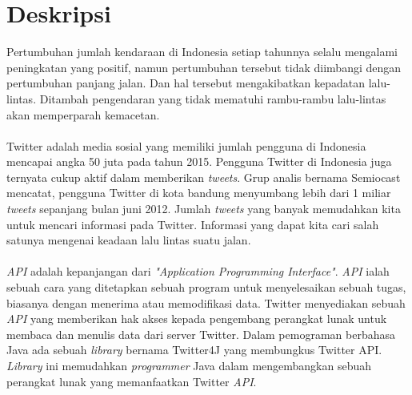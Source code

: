 \documentclass[a4paper,twoside]{article}
\begin{document}
\title{\@judultopik}
\author{\nama \textendash \@npm}

\newcommand{\nama}{Steven Daniel}
\newcommand{\@npm}{2012730021}
\newcommand{\@judultopik}{Penentuan Tingkat Kemacetan Berdasarkan Twitter Menggunakan Jaringan Syaraf Tiruan} %
\newcommand{\jumpemb}{1} %
\newcommand{\tanggal}{8/27/2015}
\maketitle


\section{Deskripsi}
Pertumbuhan jumlah kendaraan di Indonesia setiap tahunnya selalu mengalami peningkatan yang positif, namun pertumbuhan tersebut tidak diimbangi dengan pertumbuhan panjang jalan. Dan hal tersebut mengakibatkan kepadatan lalu-lintas. Ditambah pengendaran yang tidak mematuhi rambu-rambu lalu-lintas akan memperparah kemacetan.\\\\
Twitter adalah media sosial yang memiliki jumlah pengguna di Indonesia mencapai angka 50 juta pada tahun 2015. Pengguna Twitter di Indonesia juga ternyata cukup aktif dalam memberikan \textit{tweets}. Grup analis bernama Semiocast mencatat, pengguna Twitter di kota bandung menyumbang lebih dari 1 miliar \textit{tweets} sepanjang bulan juni 2012. Jumlah \textit{tweets} yang banyak memudahkan kita untuk mencari informasi pada Twitter. Informasi yang dapat kita cari salah satunya mengenai keadaan lalu lintas suatu jalan.\\\\
\textit{API} adalah kepanjangan dari \textit{"Application Programming Interface"}. \textit{API} ialah sebuah cara yang ditetapkan sebuah program untuk menyelesaikan sebuah tugas, biasanya dengan menerima atau memodifikasi data. Twitter menyediakan sebuah \textit{API} yang memberikan hak akses kepada pengembang perangkat lunak untuk membaca dan menulis data dari server Twitter. Dalam pemograman berbahasa Java ada sebuah \textit{library} bernama Twitter4J yang membungkus Twitter API. \textit{Library} ini memudahkan \textit{programmer} Java dalam mengembangkan sebuah perangkat lunak yang memanfaatkan Twitter \textit{API}.\\\\
\end{document}
